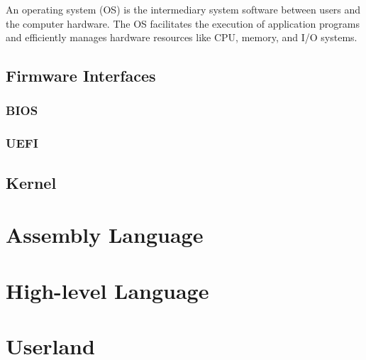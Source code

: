 \documentclass[pdftex,10pt]{article}
\begin{document}
An operating system (OS) is the intermediary system software between users and the computer hardware. The OS facilitates the execution of application programs and efficiently manages hardware resources like CPU, memory, and I/O systems.

\subsection{Firmware Interfaces}

\subsubsection{BIOS}
\subsubsection{UEFI}

\subsection{Kernel}

\section{Assembly Language}

\section{High-level Language}

\section{Userland}
\end{document}
